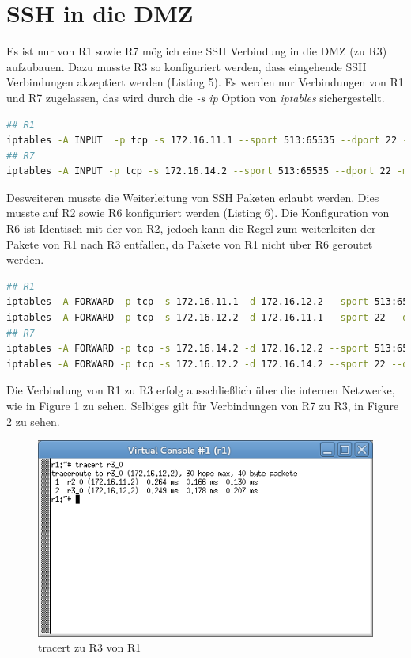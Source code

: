 \documentclass[a4paper,10pt]{article}
\begin{document}
\section{SSH in die DMZ}
Es ist nur von R1 sowie R7 möglich eine SSH Verbindung in die DMZ (zu R3) aufzubauen. Dazu musste R3 so konfiguriert werden, dass
eingehende SSH Verbindungen akzeptiert werden (Listing 5). Es werden nur Verbindungen von R1 und R7 zugelassen, das wird durch die
\textit{-s ip} Option von \textit{iptables} sichergestellt.
\begin{lstlisting}[language=bash,caption={SSH eingehend/ausgehend}]
## R1
iptables -A INPUT  -p tcp -s 172.16.11.1 --sport 513:65535 --dport 22 -m state --state NEW,ESTABLISHED -j ACCEPT
## R7
iptables -A INPUT -p tcp -s 172.16.14.2 --sport 513:65535 --dport 22 -m state --state NEW,ESTABLISHED -j ACCEPT
\end{lstlisting}
Desweiteren musste die Weiterleitung von SSH Paketen erlaubt werden. Dies musste auf R2 sowie R6 konfiguriert werden (Listing 6).
Die Konfiguration von R6 ist Identisch mit der von R2, jedoch kann die Regel zum weiterleiten der Pakete von R1 nach R3 entfallen,
da Pakete von R1 nicht über R6 geroutet werden.
\begin{lstlisting}[language=bash,caption={SSH Weiterleitung (Konfiguration von R2)}]
## R1
iptables -A FORWARD -p tcp -s 172.16.11.1 -d 172.16.12.2 --sport 513:65535 --dport 22 -m state --state NEW,ESTABLISHED -j ACCEPT
iptables -A FORWARD -p tcp -s 172.16.12.2 -d 172.16.11.1 --sport 22 --dport 513:65535 -m state --state ESTABLISHED -j ACCEPT
## R7
iptables -A FORWARD -p tcp -s 172.16.14.2 -d 172.16.12.2 --sport 513:65535 --dport 22 -m state --state NEW,ESTABLISHED -j ACCEPT
iptables -A FORWARD -p tcp -s 172.16.12.2 -d 172.16.14.2 --sport 22 --dport 513:65535 -m state --state ESTABLISHED -j ACCEPT
\end{lstlisting}
Die Verbindung von R1 zu R3 erfolg ausschließlich über die internen Netzwerke, wie in Figure 1 zu sehen.
Selbiges gilt für Verbindungen von R7 zu R3, in Figure 2 zu sehen.
\begin{figure}[h]
  \centering\includegraphics[scale=.5]{tracert_r1_to_r3.png}
  \caption{tracert zu R3 von R1}
\end{figure}
\end{document}
